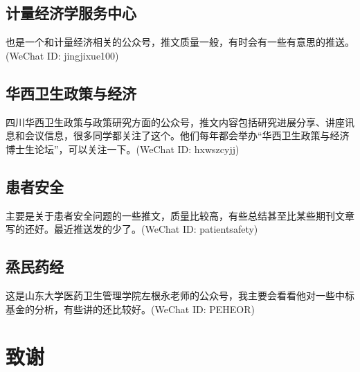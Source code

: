 \documentclass[11pt, a4paper]{article}
\begin{document}
\subsection{计量经济学服务中心}
也是一个和计量经济相关的公众号，推文质量一般，有时会有一些有意思的推送。(WeChat ID: jingjixue100)

\subsection{华西卫生政策与经济}
四川华西卫生政策与政策研究方面的公众号，推文内容包括研究进展分享、讲座讯息和会议信息，很多同学都关注了这个。他们每年都会举办“华西卫生政策与经济博士生论坛”，可以关注一下。(WeChat ID: hxwszcyjj)

\subsection{患者安全}
主要是关于患者安全问题的一些推文，质量比较高，有些总结甚至比某些期刊文章写的还好。最近推送发的少了。(WeChat ID: patientsafety)

\subsection{烝民药经}
这是山东大学医药卫生管理学院左根永老师的公众号，我主要会看看他对一些中标基金的分析，有些讲的还比较好。(WeChat ID: PEHEOR)






\section{致谢}
\end{document}

